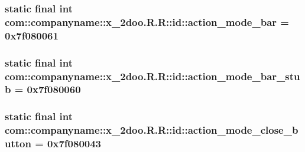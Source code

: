 \hypertarget{classcom_1_1companyname_1_1x__2doo_1_1_r_1_1id_fe1f8bfb1738a466bc2b7e36e7d4febe}{
\subsubsection[{action\_\-mode\_\-bar}]{\setlength{\rightskip}{0pt plus 5cm}static final int com::companyname::x\_\-2doo.R.R::id::action\_\-mode\_\-bar = 0x7f080061}}
\label{classcom_1_1companyname_1_1x__2doo_1_1_r_1_1id_fe1f8bfb1738a466bc2b7e36e7d4febe}


\hypertarget{classcom_1_1companyname_1_1x__2doo_1_1_r_1_1id_21cb01ab561b93d1c0c4b0bf692e71d1}{
\subsubsection[{action\_\-mode\_\-bar\_\-stub}]{\setlength{\rightskip}{0pt plus 5cm}static final int com::companyname::x\_\-2doo.R.R::id::action\_\-mode\_\-bar\_\-stub = 0x7f080060}}
\label{classcom_1_1companyname_1_1x__2doo_1_1_r_1_1id_21cb01ab561b93d1c0c4b0bf692e71d1}


\hypertarget{classcom_1_1companyname_1_1x__2doo_1_1_r_1_1id_ec1be11dc58649f33195a4b929c3fa74}{
\subsubsection[{action\_\-mode\_\-close\_\-button}]{\setlength{\rightskip}{0pt plus 5cm}static final int com::companyname::x\_\-2doo.R.R::id::action\_\-mode\_\-close\_\-button = 0x7f080043}}
\label{classcom_1_1companyname_1_1x__2doo_1_1_r_1_1id_ec1be11dc58649f33195a4b929c3fa74}



